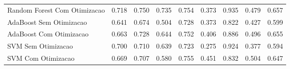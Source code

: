 \begin{table}[H]
\begin{adjustwidth}{ -1in }{ -1in }
\begin{tabular}{lrrrrrrrr}
      Random Forest Com Otimizacao &                        0.718 &                         0.750 &                            0.735 &                            0.754 &                          0.373 &                          0.935 &                                     0.479 &                                 0.657 \\
           AdaBoost Sem Otimizacao &                        0.641 &                         0.674 &                            0.504 &                            0.728 &                          0.373 &                          0.822 &                                     0.427 &                                 0.599 \\
           AdaBoost Com Otimizacao &                        0.663 &                         0.728 &                            0.644 &                            0.752 &                          0.406 &                          0.886 &                                     0.496 &                                 0.655 \\
                SVM Sem Otimizacao &                        0.700 &                         0.710 &                            0.639 &                            0.723 &                          0.275 &                          0.924 &                                     0.377 &                                 0.594 \\
                SVM Com Otimizacao &                        0.669 &                         0.707 &                            0.580 &                            0.755 &                          0.451 &                          0.832 &                                     0.504 &                                 0.647 \\
\bottomrule
\end{tabular}
    \end{adjustwidth}
    \renewcommand{\arraystretch}{1.0} %
\end{table}
